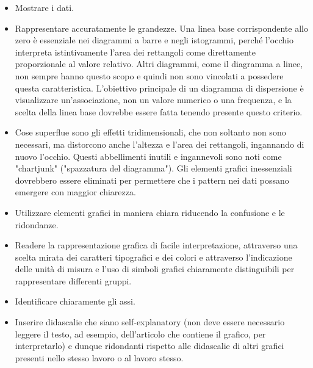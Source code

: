 \documentclass[10pt, draft]{book}
\newcommand{\tightlist}{%
\setlength{\itemsep}{1pt}\setlength{\parskip}{0pt}\setlength{\parsep}{0pt}}
\begin{document}
\begin{itemize} \tightlist
    \item Mostrare i dati.
    \item Rappresentare accuratamente le grandezze. Una linea base corrispondente allo zero è essenziale nei diagrammi a barre e negli istogrammi, perché l'occhio interpreta istintivamente l'area dei rettangoli come direttamente proporzionale al valore relativo. Altri diagrammi, come il diagramma a linee, non sempre hanno questo scopo e quindi non sono vincolati a possedere questa caratteristica. L'obiettivo principale di un diagramma di dispersione è visualizzare un'associazione, non un valore numerico o una frequenza, e la scelta della linea base dovrebbe essere fatta tenendo presente questo criterio.
    \item Cose superflue sono gli effetti tridimensionali, che non soltanto non sono necessari, ma distorcono anche l'altezza e l'area dei rettangoli, ingannando di nuovo l'occhio. Questi abbellimenti inutili e ingannevoli sono noti come "chartjunk" ("spazzatura del diagramma"). Gli elementi grafici inessenziali dovrebbero essere eliminati per permettere che i pattern nei dati possano emergere con maggior chiarezza.
    \item Utilizzare elementi grafici in maniera chiara riducendo la confusione e le ridondanze.
    \item Readere la rappresentazione grafica di facile interpretazione, attraverso una scelta mirata dei caratteri tipografici e dei colori e attraverso l'indicazione delle unità di misura e l'uso di simboli grafici chiaramente distinguibili per rappresentare differenti gruppi.
    \item Identificare chiaramente gli assi.
    \item Inserire didascalie che siano self-explanatory (non deve essere necessario leggere il testo, ad esempio, dell'articolo che contiene il grafico, per interpretarlo) e dunque ridondanti rispetto alle didascalie di altri grafici presenti nello stesso lavoro o al lavoro stesso.
\end{itemize}
\end{document}
